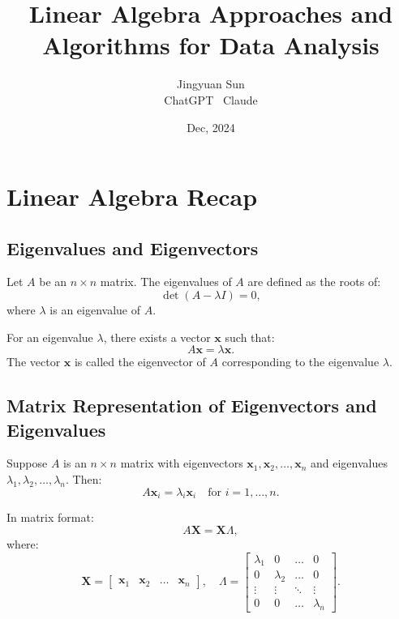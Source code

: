 \documentclass[12pt,a4paper]{article}
\title{\textbf{Linear Algebra Approaches and Algorithms for Data Analysis}}
\author{Jingyuan Sun \\ ChatGPT \ Claude}
\date{Dec, 2024}
\begin{document}
\maketitle

\section{Linear Algebra Recap}
\subsection{Eigenvalues and Eigenvectors}
Let $A$ be an $n \times n$ matrix. The eigenvalues of $A$ are defined as the roots of:
\begin{equation}
\det(A - \lambda I) = 0,
\end{equation}
where $\lambda$ is an eigenvalue of $A$.

For an eigenvalue $\lambda$, there exists a vector $\mathbf{x}$ such that:
\begin{equation}
A \mathbf{x} = \lambda \mathbf{x}.
\end{equation}
The vector $\mathbf{x}$ is called the eigenvector of $A$ corresponding to the eigenvalue $\lambda$.

\subsection{Matrix Representation of Eigenvectors and Eigenvalues}
Suppose $A$ is an $n \times n$ matrix with eigenvectors $\mathbf{x}_1, \mathbf{x}_2, \ldots, \mathbf{x}_n$ and eigenvalues $\lambda_1, \lambda_2, \ldots, \lambda_n$. Then:
\begin{equation}
A \mathbf{x}_i = \lambda_i \mathbf{x}_i \quad \text{for } i = 1, \ldots, n.
\end{equation}

In matrix format:
\begin{equation}
A \mathbf{X} = \mathbf{X} \Lambda,
\end{equation}
where:
\begin{equation}
\mathbf{X} = \begin{bmatrix}
\mathbf{x}_1 & \mathbf{x}_2 & \ldots & \mathbf{x}_n
\end{bmatrix}, \quad
\Lambda = \begin{bmatrix}
\lambda_1 & 0 & \ldots & 0 \\
0 & \lambda_2 & \ldots & 0 \\
\vdots & \vdots & \ddots & \vdots \\
0 & 0 & \ldots & \lambda_n
\end{bmatrix}.
\end{equation}
\end{document}
